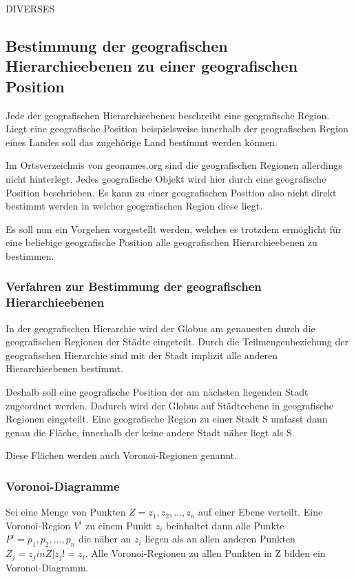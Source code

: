 DIVERSES


\subsection{Bestimmung der geografischen Hierarchieebenen zu einer geografischen Position} 
			
			Jede der geografischen Hierarchieebenen beschreibt eine geografische Region.
			Liegt eine geografische Position beispielsweise innerhalb der geografischen Region eines Landes soll das zugehörige Land bestimmt werden können.

			Im Ortsverzeichnis von geonames.org sind die geografischen Regionen allerdings nicht hinterlegt.
			Jedes geografische Objekt wird hier durch eine geografische Position beschrieben.
			Es kann zu einer geografischen Position also nicht direkt bestimmt werden in welcher geografischen Region diese liegt.

			Es soll nun ein Vorgehen vorgestellt werden, welches es trotzdem ermöglicht für eine beliebige geografische Position alle geografischen Hierarchieebenen zu bestimmen.
			
			\subsubsection{Verfahren zur Bestimmung der geografischen Hierarchieebenen}

				In der geografischen Hierarchie wird der Globus am genauesten durch die geografischen Regionen der Städte eingeteilt.
				Durch die Teilmengenbeziehung der geografischen Hierarchie sind mit der Stadt implizit alle anderen Hierarchieebenen bestimmt.

				Deshalb soll eine geografische Position der am nächsten liegenden Stadt zugeordnet werden.
				Dadurch wird der Globus auf Städteebene in geografische Regionen eingeteilt. 
				Eine geografische Region zu einer Stadt S umfasst dann genau die Fläche, innerhalb der keine andere Stadt näher liegt als S.

				Diese Flächen werden auch Voronoi-Regionen genannt.

			\subsubsection{Voronoi-Diagramme} 

				Sei eine Menge von Punkten $Z = {z_1,z_2,...,z_n}$ auf einer Ebene verteilt.
				Eine Voronoi-Region $V^i$ zu einem Punkt $z_i$ beinhaltet dann alle Punkte $P^i={p_1,p_2,...,p_n}$ die näher an $z_i$ liegen als an allen anderen Punkten $Z_j={z_j in Z|z_j!=z_i}$.
				Alle Voronoi-Regionen zu allen Punkten in Z bilden ein Voronoi-Diagramm.

